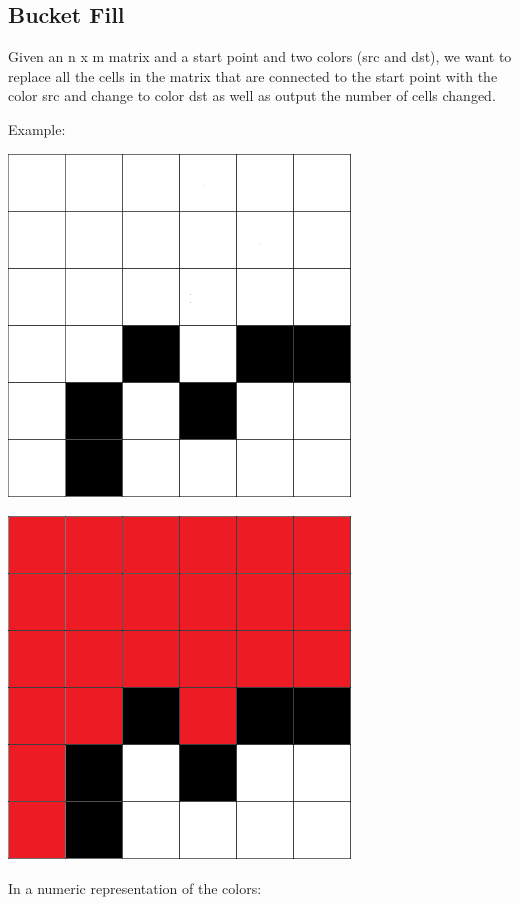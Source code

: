 \documentclass[11pt,oneside]{book}
\makeatletter
\def\maxwidth#1{\ifdim\Gin@nat@width>#1 #1\else\Gin@nat@width\fi}
\makeatother
\begin{document}
\subsection{Bucket Fill}

Given an n x m matrix and a start point and two colors (src and dst), we want to replace all the cells in the matrix that are connected to the start point with the color src and change to color dst as well as output the number of cells changed.

Example:

\vspace{5px}\includegraphics[width=\maxwidth{\textwidth}]{bucket.png}

\vspace{5px}\includegraphics[width=\maxwidth{\textwidth}]{bucket2.png}

In a numeric representation of the colors:
\end{document}
